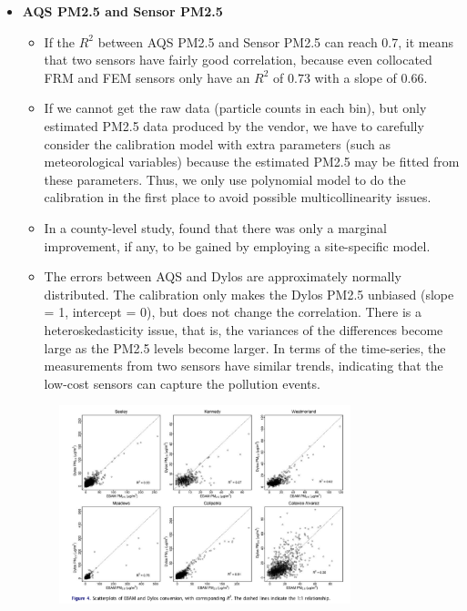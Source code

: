 \documentclass{article}
\begin{document}
\begin{itemize}
{\begin{itemize}
        \end{itemize}
    }
    \item \textbf{AQS PM2.5 and Sensor PM2.5} {
        \begin{itemize}
            \item If the $R^2$ between AQS PM2.5 and Sensor PM2.5 can reach 0.7, it means that two sensors have fairly good correlation, because even collocated FRM and FEM sensors only have an $R^2$ of $0.73$ with a slope of 0.66. \citep{carvlin2017development}
            \item If we cannot get the raw data (particle counts in each bin), but only estimated PM2.5 data produced by the vendor, we have to carefully consider the calibration model with extra parameters (such as meteorological variables) because the estimated PM2.5 may be fitted from these parameters. Thus, we only use polynomial model to do the calibration in the first place to avoid possible multicollinearity issues. 
            \item In a county-level study, \citet{carvlin2017development} found that there was only a marginal improvement, if any, to be gained by employing a site-specific model. 
            \item The errors between AQS and Dylos are approximately normally distributed. The calibration only makes the Dylos PM2.5 unbiased (slope = 1, intercept = 0), but does not change the correlation. There is a heteroskedasticity issue, that is, the variances of the differences become large as the PM2.5 levels become larger. In terms of the time-series, the measurements from two sensors have similar trends, indicating that the low-cost sensors can capture the pollution events.
        \end{itemize}
        \begin{figure}[H]
            \centering
            \includegraphics[width=0.8\textwidth]{img/dylos.png}

\end{figure}}
\end{itemize}
\end{document}

